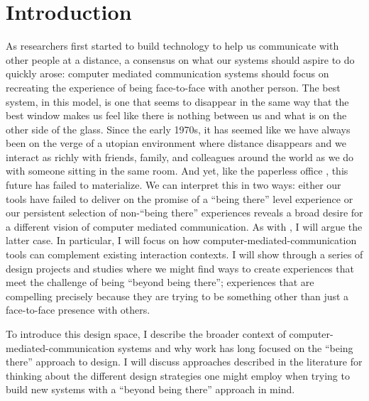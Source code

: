 \chapter{Introduction}
\label{ch:intro}


As researchers first started to build technology to help us communicate with other people at a distance, a consensus on what our systems should aspire to do quickly arose: computer mediated communication systems should focus on recreating the experience of being face-to-face with another person. The best system, in this model, is one that seems to disappear in the same way that the best window makes us feel like there is nothing between us and what is on the other side of the glass. Since the early 1970s, it has seemed like we have always been on the verge of a utopian environment where distance disappears and we interact as richly with friends, family, and colleagues around the world as we do with someone sitting in the same room. \citep{Egido:1988vq} And yet, like the paperless office \citep{Sellen:2001uk}, this future has failed to materialize. We can interpret this in two ways: either our tools have failed to deliver on the promise of a ``being there'' level experience or our persistent selection of non-``being there'' experiences reveals a broad desire for a different vision of computer mediated communication. As with \citet{Hollan:1992tz}, I will argue the latter case. In particular, I will focus on how  computer-mediated-communication tools can complement existing interaction contexts. I will show through a series of design projects and studies where we might find ways to create experiences that meet the challenge of being ``beyond being there''; experiences that are compelling precisely because they are trying to be something other than just a face-to-face presence with others.

To introduce this design space, I describe the broader context of computer-mediated-communication systems and why work has long focused on the ``being there'' approach to design. I will discuss approaches described in the literature for thinking about the different design strategies one might employ when trying to build new systems with a ``beyond being there'' approach in mind.


